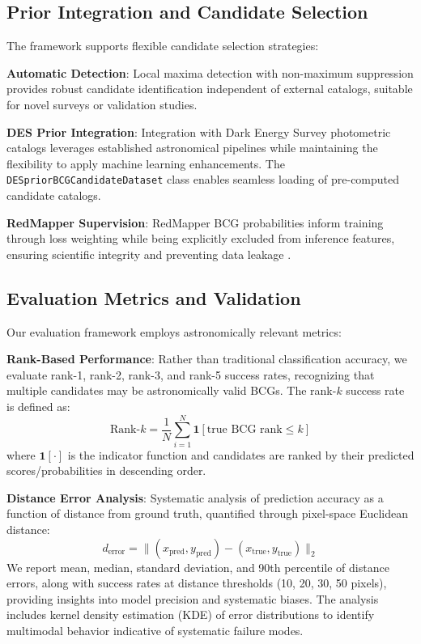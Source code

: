 \documentclass[twocolumn,10pt]{aastex631}
\begin{document}
\subsection{Prior Integration and Candidate Selection}

The framework supports flexible candidate selection strategies:

\textbf{Automatic Detection}: Local maxima detection with non-maximum suppression provides robust candidate identification independent of external catalogs, suitable for novel surveys or validation studies.

\textbf{DES Prior Integration}: Integration with Dark Energy Survey photometric catalogs leverages established astronomical pipelines while maintaining the flexibility to apply machine learning enhancements. The \texttt{DESpriorBCGCandidateDataset} class enables seamless loading of pre-computed candidate catalogs.

\textbf{RedMapper Supervision}: RedMapper BCG probabilities inform training through loss weighting while being explicitly excluded from inference features, ensuring scientific integrity and preventing data leakage \citep{Rykoff2014redMaPPer}.

\subsection{Evaluation Metrics and Validation}

Our evaluation framework employs astronomically relevant metrics:

\textbf{Rank-Based Performance}: Rather than traditional classification accuracy, we evaluate rank-1, rank-2, rank-3, and rank-5 success rates, recognizing that multiple candidates may be astronomically valid BCGs. The rank-$k$ success rate is defined as:
\begin{equation}
\text{Rank-}k = \frac{1}{N} \sum_{i=1}^{N} \mathbf{1}[\text{true BCG rank} \leq k]
\end{equation}
where $\mathbf{1}[\cdot]$ is the indicator function and candidates are ranked by their predicted scores/probabilities in descending order.

\textbf{Distance Error Analysis}: Systematic analysis of prediction accuracy as a function of distance from ground truth, quantified through pixel-space Euclidean distance:
\begin{equation}
d_{\text{error}} = \|(x_{\text{pred}}, y_{\text{pred}}) - (x_{\text{true}}, y_{\text{true}})\|_2
\end{equation}
We report mean, median, standard deviation, and 90th percentile of distance errors, along with success rates at distance thresholds (10, 20, 30, 50 pixels), providing insights into model precision and systematic biases. The analysis includes kernel density estimation (KDE) of error distributions to identify multimodal behavior indicative of systematic failure modes.
\end{document}
